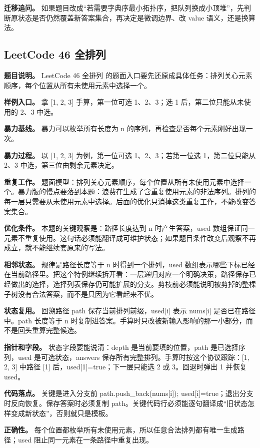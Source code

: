 \textbf{迁移追问。} 如果题目改成“若需要字典序最小拓扑序，把队列换成小顶堆”，先判断原状态是否仍然覆盖新答案集合，再决定是微调边界、改 value 语义，还是换算法。

\subsection{LeetCode 46 全排列}

\textbf{题目说明。} LeetCode 46 全排列 的题面入口要先还原成具体任务：排列关心元素顺序，每个位置从所有未使用元素中选择一个。

\textbf{样例入口。} 拿 [1, 2, 3] 手算，第一位可选 1、2、3；选 1 后，第二位只能从未使用的 2、3 中选。

\textbf{暴力基线。} 暴力可以枚举所有长度为 n 的序列，再检查是否每个元素刚好出现一次。

\textbf{暴力过程。} 以 [1, 2, 3] 为例，第一位可选 1、2、3；若第一位选 1，第二位只能从 2、3 中选，第三位由剩余元素决定。

\textbf{重复工作。} 题面模型：排列关心元素顺序，每个位置从所有未使用元素中选择一个。暴力版的慢点要落到本题：浪费在生成了含重复使用元素的非法序列。排列的每一层只需要从未使用元素中选择。后面的优化只消掉这类重复工作，不能改变答案集合。

\textbf{优化条件。} 本题的关键观察是：路径长度达到 n 时产生答案，used 数组保证同一元素不重复使用。这句话必须能翻译成可维护状态；如果题目条件改变后观察不再成立，就不能继续套原来的写法。

\textbf{相邻状态。} 规律是路径长度等于 n 时得到一个排列，used 数组表示哪些下标已经在当前路径里。把这个特例继续拆开看：一层递归对应一个明确决策，路径保存已经做出的选择，选择列表保存仍可能扩展的分支。剪枝前必须能说明被剪掉的整棵子树没有合法答案，而不是只因为它看起来不优。

\textbf{状态复用。} 回溯路径 path 保存当前排列前缀，used[i] 表示 nums[i] 是否已在路径中。path 长度等于 n 时复制进答案。手算时只改被新输入影响的那一小部分，而不是回头重算完整候选。

\textbf{指针和字段。} 状态字段要能说清：depth 是当前要填的位置，path 是已选择序列，used 是可选状态，answers 保存所有完整排列。手算时按这个协议跟踪：[1, 2, 3] 中路径 [1] 后，used[1]=true；下一层只能选 2 或 3。回退时弹出 1 并恢复 used。

\textbf{代码落点。} 关键是进入分支前 path.push\_back(nums[i]); used[i]=true；退出分支时反向恢复。保存答案时必须复制 path。关键代码行必须能逐句翻译成“旧状态怎样变成新状态”，否则就只是模板。

\textbf{正确性。} 每个位置都枚举所有未使用元素，所以任意合法排列都有唯一生成路径；used 阻止同一元素在一条路径中重复出现。

